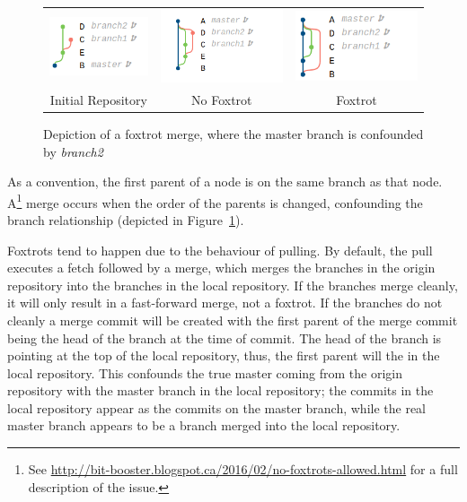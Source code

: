 \begin{figure}[htpb]
  \centering
  \begin{tabular}{ccc}
    \includegraphics[width=114px]{Figures/background/foxtrot_initial.png} &
    \includegraphics[width=145px]{Figures/background/foxtrot_good.png} &
    \includegraphics[width=145px]{Figures/background/foxtrot_bad.png} \\
    Initial Repository & No Foxtrot & Foxtrot
  \end{tabular}
  \caption{Depiction of a foxtrot merge, where the master branch is
    confounded by \emph{branch2}}
  \label{fig:foxtrot_steps}
\end{figure}

As a convention, the first parent of a node is on the same branch as
that node.
A\foxtrot\footnote{See \url{http://bit-booster.blogspot.ca/2016/02/no-foxtrots-allowed.html} for a full description of the issue.}
merge occurs when the order of the parents is changed, confounding the
branch relationship (depicted in Figure~\ref{fig:foxtrot_steps}).

Foxtrots tend to happen due to the behaviour of pulling.
By default, the pull executes a fetch followed by a merge, which merges
the branches in the origin repository into the branches in the local
repository.
If the branches merge cleanly, it will only result in a fast-forward
merge, not a foxtrot.
If the branches do not cleanly a merge commit will be created with the
first parent of the merge commit being the head of the branch at the
time of commit.
The head of the branch is pointing at the top of the
local repository, thus, the first parent will the in the local
repository.
This confounds the true master coming from the origin repository with
the master branch in the local repository; the commits in the local
repository appear as the commits on the master branch, while the real
master branch appears to be a branch merged into the local repository.

